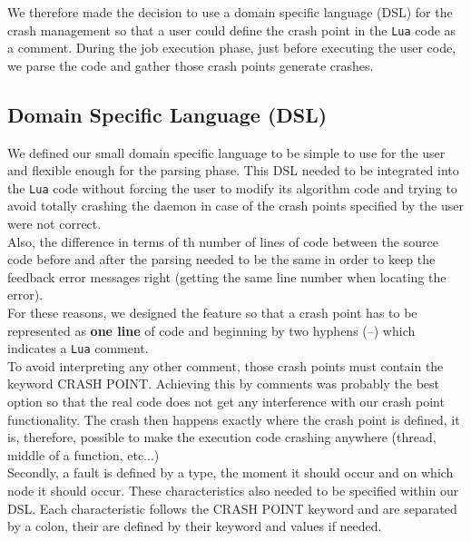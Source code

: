\documentclass{eplmastersthesis}
\begin{document}
      We therefore made the decision to use a domain specific language (DSL)
      for the crash management so that a user could define the crash point
      in the \texttt{Lua} code as a comment. During the job execution phase, just before
      executing the user code, we parse the code and gather those crash
      points generate crashes.

      \subsection{Domain Specific Language (DSL)}

        We defined our small domain specific language to be simple to use
        for the user and flexible enough for the parsing phase. This DSL
        needed to be integrated into the \texttt{Lua} code without forcing the user to
        modify its algorithm code and trying to avoid totally crashing
        the daemon in case of the crash points specified by the user were
        not correct.\\
        Also, the difference in terms of th number of lines of code between the
        source code before and after the parsing needed to be the same in
        order to keep the feedback error messages right (getting the same line
        number when locating the error).\\

        For these reasons, we designed the feature so that a crash point has
        to be represented as \textbf{one line} of code and beginning by
        two hyphens (--) which indicates a \texttt{Lua} comment.\\
        To avoid interpreting any other comment, those crash points must
        contain the keyword \textsc{CRASH POINT}. Achieving this by comments
        was probably the best option so that the real code does not get any
        interference with our crash point functionality. The crash then
        happens exactly where the crash point is defined, it is, therefore,
        possible to make the execution code crashing anywhere (thread, middle
        of a function, etc...)\\

        Secondly, a fault is defined by a type, the moment it should occur and
        on which node it should occur. These characteristics also needed to
        be specified within our DSL. Each characteristic follows the
        \textsc{CRASH POINT} keyword and are separated by a colon, their are
        defined by their keyword and values if needed.
\end{document}

